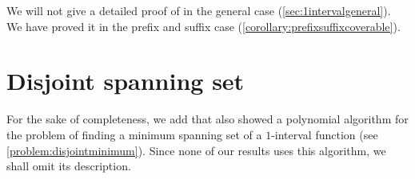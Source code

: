 We will not give a detailed proof of
in the general case (\cref{sec:1intervalgeneral}).
We have proved it in the prefix and suffix case
(\cref{corollary:prefixsuffixcoverable}).

\section{Disjoint spanning set}

For the sake of completeness,
we add that
\citeauthor{Schieber2005154} also showed a polynomial
algorithm for the problem of finding
a minimum  spanning set
of a $1$-interval function
\citep[Section 4]{Schieber2005154}
(see \cref{problem:disjointminimum}).
Since none of our results uses this algorithm,
we shall omit its description.

